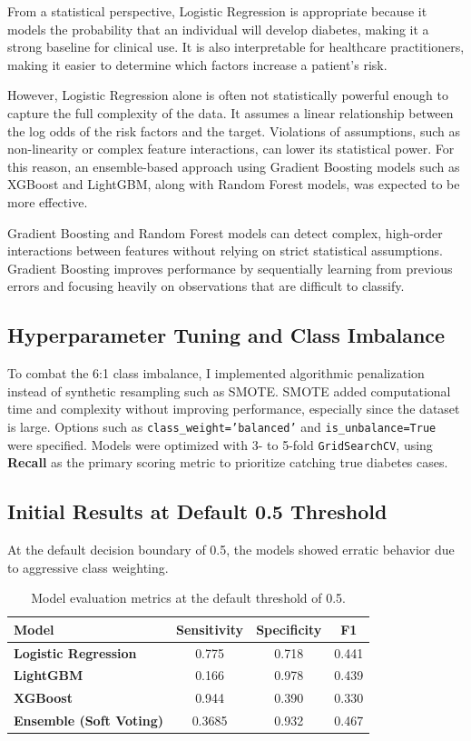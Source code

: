 \documentclass[11pt,letterpaper]{article}
\begin{document}
From a statistical perspective, Logistic Regression is appropriate because it models the probability that an individual will develop diabetes, making it a strong baseline for clinical use. It is also interpretable for healthcare practitioners, making it easier to determine which factors increase a patient's risk.

However, Logistic Regression alone is often not statistically powerful enough to capture the full complexity of the data. It assumes a linear relationship between the log odds of the risk factors and the target. Violations of assumptions, such as non-linearity or complex feature interactions, can lower its statistical power. For this reason, an ensemble-based approach using Gradient Boosting models such as XGBoost and LightGBM, along with Random Forest models, was expected to be more effective.

Gradient Boosting and Random Forest models can detect complex, high-order interactions between features without relying on strict statistical assumptions. Gradient Boosting improves performance by sequentially learning from previous errors and focusing heavily on observations that are difficult to classify.

\subsection{Hyperparameter Tuning and Class Imbalance}
To combat the 6:1 class imbalance, I implemented algorithmic penalization instead of synthetic resampling such as SMOTE. SMOTE added computational time and complexity without improving performance, especially since the dataset is large. Options such as \texttt{class\_weight='balanced'} and \texttt{is\_unbalance=True} were specified. Models were optimized with 3- to 5-fold \texttt{GridSearchCV}, using \textbf{Recall} as the primary scoring metric to prioritize catching true diabetes cases.

\subsection{Initial Results at Default 0.5 Threshold}
At the default decision boundary of 0.5, the models showed erratic behavior due to aggressive class weighting.

\begin{table}[H]
\centering
\caption{Model evaluation metrics at the default threshold of 0.5.}
\begin{tabularx}{\linewidth}{>{\bfseries}Xccc}
\toprule
Model & Sensitivity & Specificity & F1 \\
\midrule
Logistic Regression & 0.775 & 0.718 & 0.441 \\
LightGBM & 0.166 & 0.978 & 0.439 \\
XGBoost & 0.944 & 0.390 & 0.330 \\
Ensemble (Soft Voting) & 0.3685 & 0.932 & 0.467 \\
\bottomrule
\end{tabularx}
\end{table}
\end{document}
